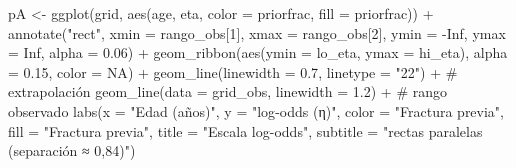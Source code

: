 \documentclass[
  letterpaper,
  DIV=11,
  numbers=noendperiod]{scrartcl}
\newenvironment{Shaded}{\begin{snugshade}}{\end{snugshade}}
\newcommand{\AttributeTok}[1]{\textcolor[rgb]{0.40,0.45,0.13}{#1}}
\newcommand{\CommentTok}[1]{\textcolor[rgb]{0.37,0.37,0.37}{#1}}
\newcommand{\ConstantTok}[1]{\textcolor[rgb]{0.56,0.35,0.01}{#1}}
\newcommand{\DecValTok}[1]{\textcolor[rgb]{0.68,0.00,0.00}{#1}}
\newcommand{\FloatTok}[1]{\textcolor[rgb]{0.68,0.00,0.00}{#1}}
\newcommand{\FunctionTok}[1]{\textcolor[rgb]{0.28,0.35,0.67}{#1}}
\newcommand{\NormalTok}[1]{\textcolor[rgb]{0.00,0.23,0.31}{#1}}
\newcommand{\OtherTok}[1]{\textcolor[rgb]{0.00,0.23,0.31}{#1}}
\newcommand{\SpecialCharTok}[1]{\textcolor[rgb]{0.37,0.37,0.37}{#1}}
\newcommand{\StringTok}[1]{\textcolor[rgb]{0.13,0.47,0.30}{#1}}
\begin{document}
\begin{Shaded}
\begin{Highlighting}[]
\NormalTok{pA }\OtherTok{\textless{}{-}} \FunctionTok{ggplot}\NormalTok{(grid, }\FunctionTok{aes}\NormalTok{(age, eta, }\AttributeTok{color =}\NormalTok{ priorfrac, }\AttributeTok{fill =}\NormalTok{ priorfrac)) }\SpecialCharTok{+}
  \FunctionTok{annotate}\NormalTok{(}\StringTok{"rect"}\NormalTok{, }\AttributeTok{xmin =}\NormalTok{ rango\_obs[}\DecValTok{1}\NormalTok{], }\AttributeTok{xmax =}\NormalTok{ rango\_obs[}\DecValTok{2}\NormalTok{],}
           \AttributeTok{ymin =} \SpecialCharTok{{-}}\ConstantTok{Inf}\NormalTok{, }\AttributeTok{ymax =} \ConstantTok{Inf}\NormalTok{, }\AttributeTok{alpha =} \FloatTok{0.06}\NormalTok{) }\SpecialCharTok{+}
  \FunctionTok{geom\_ribbon}\NormalTok{(}\FunctionTok{aes}\NormalTok{(}\AttributeTok{ymin =}\NormalTok{ lo\_eta, }\AttributeTok{ymax =}\NormalTok{ hi\_eta), }\AttributeTok{alpha =} \FloatTok{0.15}\NormalTok{, }\AttributeTok{color =} \ConstantTok{NA}\NormalTok{) }\SpecialCharTok{+}
  \FunctionTok{geom\_line}\NormalTok{(}\AttributeTok{linewidth =} \FloatTok{0.7}\NormalTok{, }\AttributeTok{linetype =} \StringTok{"22"}\NormalTok{) }\SpecialCharTok{+}          \CommentTok{\# extrapolación}
  \FunctionTok{geom\_line}\NormalTok{(}\AttributeTok{data =}\NormalTok{ grid\_obs, }\AttributeTok{linewidth =} \FloatTok{1.2}\NormalTok{) }\SpecialCharTok{+}          \CommentTok{\# rango observado}
  \FunctionTok{labs}\NormalTok{(}\AttributeTok{x =} \StringTok{"Edad (años)"}\NormalTok{, }\AttributeTok{y =} \StringTok{"log{-}odds (η)"}\NormalTok{,}
       \AttributeTok{color =} \StringTok{"Fractura previa"}\NormalTok{, }\AttributeTok{fill =} \StringTok{"Fractura previa"}\NormalTok{,}
       \AttributeTok{title =} \StringTok{"Escala log{-}odds"}\NormalTok{, }\AttributeTok{subtitle =} \StringTok{"rectas paralelas (separación ≈ 0,84)"}\NormalTok{)}


\end{Highlighting}
\end{Shaded}
\end{document}
